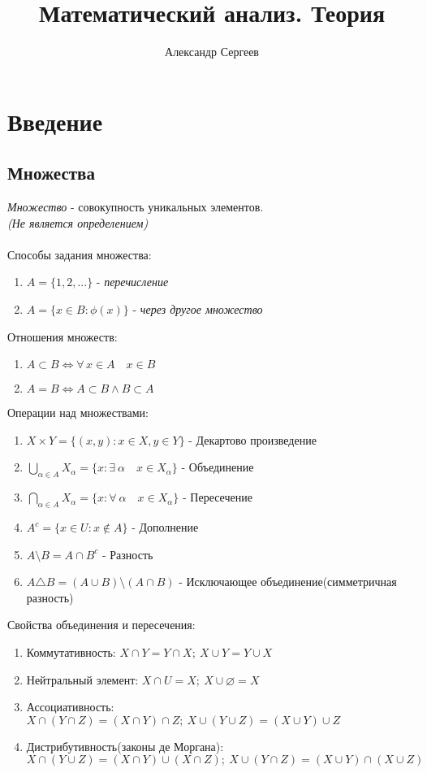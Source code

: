 \documentclass[12pt]{article}
\title{Математический анализ. Теория}
\author{Александр Сергеев}
\date{}
\begin{document}
\maketitle
\section{Введение}
\subsection{Множества}
\textit{Множество} - совокупность уникальных элементов. \\\textit{(Не является определением)}\\\\
Способы задания множества:
\begin{enumerate}
    \item $A = \{1,2, ...\}$ - \textit{перечисление}
    \item $A = \{ x \in B: \phi (x) \}$ - \textit{через другое множество}
\end{enumerate}
Отношения множеств:
\begin{enumerate}
    \item $A \subset B \Leftrightarrow \forall\,x \in A \quad x \in B$
    \item $A = B \Leftrightarrow A \subset B \land B \subset A$
\end{enumerate}
Операции над множествами:
\begin{enumerate}
    \item $X \times Y = \{ (x,y): x \in X, y \in Y\}$ - Декартово произведение 
    \item $\bigcup_{\alpha \in A} X_\alpha = \{ x: \exists\ \alpha\quad x \in X_\alpha\}$ - Объединение
    \item $\bigcap_{\alpha \in A} X_\alpha = \{ x: \forall\ \alpha\quad x \in X_\alpha\}$ - Пересечение
    \item $A^c = \{ x \in U: x \notin A \}$ - Дополнение
    \item $A \setminus B = A \cap B^c$ - Разность
    \item $A \triangle B = (A \cup B) \setminus (A \cap B)$ - Исключающее объединение(симметричная разность)
\end{enumerate}
Свойства объединения и пересечения:
\begin{enumerate}
    \item Коммутативность: $X \cap Y = Y \cap X;\ X \cup Y = Y \cup X$
    \item Нейтральный элемент: $X \cap U = X;\ X \cup \varnothing = X$
    \item Ассоциативность: $X\cap(Y \cap Z) = (X \cap Y)\cap Z;\ X \cup (Y \cup Z) = (X \cup Y) \cup Z$
    \item Дистрибутивность(законы де Моргана):\\ $X\cap(Y\cup Z) = (X \cap Y) \cup (X \cap Z);\ X\cup(Y\cap Z) = (X \cup Y) \cap (X \cup Z)$
\end{enumerate}
\end{document}
